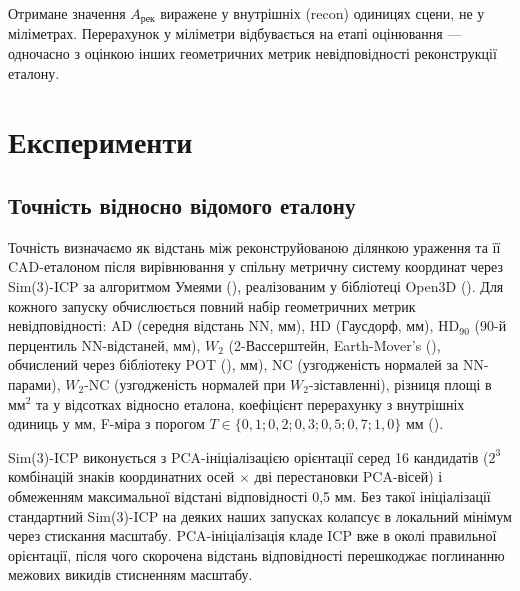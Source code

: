 \documentclass[
  ukrainian,
  10pt,
  a4paper,
  twocolumn]{article}
\begin{document}
Отримане значення \(A_\text{рек}\) виражене у внутрішніх (recon)
одиницях сцени, не у міліметрах. Перерахунок у міліметри відбувається на
етапі оцінювання --- одночасно з оцінкою інших геометричних метрик
невідповідності реконструкції еталону.

\section{Експерименти}\label{ux435ux43aux441ux43fux435ux440ux438ux43cux435ux43dux442ux438}

\subsection{Точність відносно відомого
еталону}\label{ux442ux43eux447ux43dux456ux441ux442ux44c-ux432ux456ux434ux43dux43eux441ux43dux43e-ux432ux456ux434ux43eux43cux43eux433ux43e-ux435ux442ux430ux43bux43eux43dux443}

Точність визначаємо як відстань між реконструйованою ділянкою ураження
та її CAD-еталоном після вирівнювання у спільну метричну систему
координат через Sim(3)-ICP за алгоритмом Умеями
(), реалізованим у
бібліотеці Open3D (). Для
кожного запуску обчислюється повний набір геометричних метрик
невідповідності: AD (середня відстань NN, мм), HD (Гаусдорф, мм),
HD\(_{90}\) (90-й перцентиль NN-відстаней, мм), \(W_2\) (2-Вассерштейн,
Earth-Mover's (),
обчислений через бібліотеку POT (), мм), NC (узгодженість нормалей за NN-парами), \(W_2\)-NC
(узгодженість нормалей при \(W_2\)-зіставленні), різниця площі в
мм\(^2\) та у відсотках відносно еталона, коефіцієнт перерахунку з
внутрішніх одиниць у мм, F-міра з порогом
\(T \in \{0,1; 0,2; 0,3; 0,5; 0,7; 1,0\}\) мм
().

Sim(3)-ICP виконується з PCA-ініціалізацією орієнтації серед 16
кандидатів (\(2^3\) комбінацій знаків координатних осей \(\times\) дві
перестановки PCA-вісей) і обмеженням максимальної відстані відповідності
0,5 мм. Без такої ініціалізації стандартний Sim(3)-ICP на деяких наших
запусках колапсує в локальний мінімум через стискання масштабу.
PCA-ініціалізація кладе ICP вже в околі правильної орієнтації, після
чого скорочена відстань відповідності перешкоджає поглинанню межових
викидів стисненням масштабу.
\end{document}
